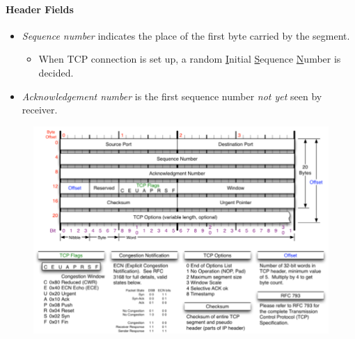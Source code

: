 \documentclass[twocolumn,english]{article}
\begin{document}
\paragraph{Header Fields}
\begin{itemize}
\item \emph{Sequence number} indicates the place of the first byte carried
by the segment.
\begin{itemize}
\item When TCP connection is set up, a random \uline{I}nitial \uline{S}equence
\uline{N}umber is decided.
\end{itemize}
\item \emph{Acknowledgement number} is the first sequence number \emph{not
yet} seen by receiver.
\end{itemize}
\begin{figure}[H]
\centering{}\includegraphics[width=0.8\linewidth]{img/tcp}
\end{figure}
\end{document}
